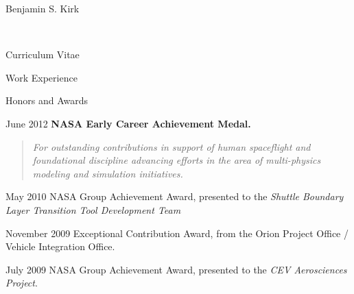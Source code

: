 \documentclass[10pt]{report}
\begin{document}
\begin{cv}{\centerline{\Large Benjamin S. Kirk}\\
    \centerline{\large Curriculum Vitae}}
\begin{cvlist}{Work Experience}
  \end{cvlist}

  \begin{cvlist}{Honors and Awards}

    \item[June 2012]
      \textbf{NASA Early Career Achievement Medal.}

      \begin{quote}
        \em For outstanding contributions in support of human spaceflight and foundational discipline advancing efforts in the area of multi-physics modeling and simulation initiatives.
      \end{quote}

    \item[May 2010]
      NASA Group Achievement Award, presented to the {\em Shuttle Boundary Layer Transition Tool Development Team}

    \item[November 2009]
      Exceptional Contribution Award, from the Orion Project Office / Vehicle Integration Office.

    \item[July 2009]
    NASA Group Achievement Award, presented to the {\em CEV Aerosciences Project}.


\end{cvlist}
\end{cv}
\end{document}
